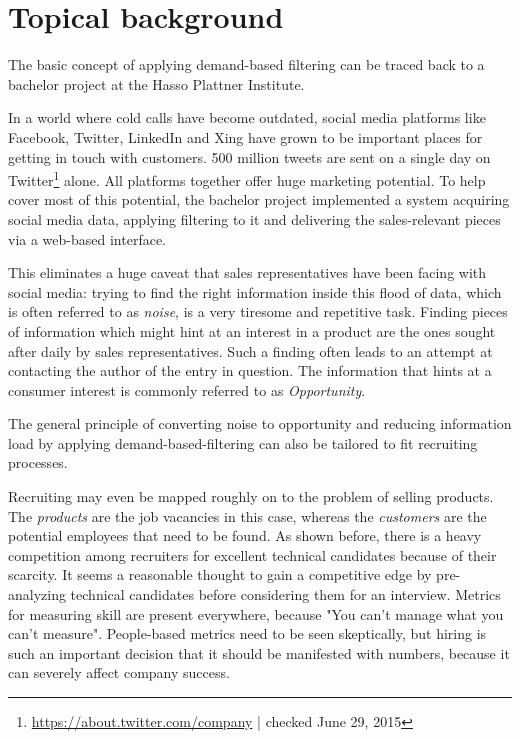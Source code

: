 \section{Topical background}
The basic concept of applying demand-based filtering can be traced back to a bachelor project at the Hasso Plattner Institute.


In a world where cold calls have become outdated\cite{bh:2014}, social media platforms like Facebook, Twitter, LinkedIn and Xing have grown to be important places for getting in touch with customers. 500 million tweets are sent on a single day on Twitter\footnote{\url{https://about.twitter.com/company} | checked June 29, 2015} alone. All platforms together offer huge marketing potential. To help cover most of this potential, the bachelor project implemented a system acquiring social media data, applying filtering to it and delivering the sales-relevant pieces via a web-based interface.

This eliminates a huge caveat that sales representatives have been facing with social media: trying to find the right information inside this flood of data, which is often referred to as \textit{noise}, is a very tiresome and repetitive task. Finding pieces of information which might hint at an interest in a product are the ones sought after daily by sales representatives. Such a finding often leads to an attempt at contacting the author of the entry in question. The information that hints at a consumer interest is commonly referred to as \textit{Opportunity}.
\newline


The general principle of converting noise to opportunity and reducing information load by applying demand-based-filtering can also be tailored to fit recruiting processes.


Recruiting may even be mapped roughly on to the problem of selling  products. The \textit{products} are the job vacancies in this case, whereas the \textit{customers} are the potential employees that need to be found. As shown before, there is a heavy competition among recruiters for excellent technical candidates because of their scarcity. It seems a reasonable thought to gain a competitive edge by pre-analyzing technical candidates before considering them for an interview. Metrics for measuring skill are present everywhere, because
"You can't manage what you can't measure"\cite{tdm:1986}.  People-based metrics need to be seen skeptically, but hiring is such an important decision that it should be manifested with numbers, because it can severely affect company success\cite{hk:1998}.
